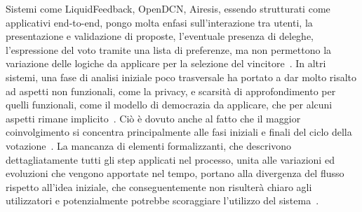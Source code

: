 \documentclass[12pt,a4paper,openright,twoside]{book}
\begin{document}
Sistemi come LiquidFeedback, OpenDCN, Airesis, essendo strutturati come applicativi end-to-end,
pongo molta enfasi sull'interazione tra utenti, la presentazione e validazione di proposte,
l'eventuale presenza di deleghe, l'espressione del voto tramite una lista di preferenze, ma
non permettono la variazione delle logiche da applicare per la selezione del vincitore~\cite{Trapanese:2018}.
In altri sistemi, una fase di analisi iniziale poco trasversale ha portato a dar molto risalto
ad aspetti non funzionali, come la privacy, e scarsità di approfondimento per quelli funzionali, come il modello di democrazia
da applicare, che per alcuni aspetti rimane implicito~\cite{Pianini:2019}.
Ciò è dovuto anche al fatto che il maggior coinvolgimento si concentra 
principalmente alle fasi iniziali e finali del ciclo della votazione~\cite{hennen2020european}.
La mancanza di elementi formalizzanti, che descrivono dettagliatamente tutti gli step applicati nel
processo, unita alle variazioni ed evoluzioni che vengono apportate nel tempo, portano alla divergenza del flusso rispetto all'idea iniziale, 
che conseguentemente non risulterà chiaro agli utilizzatori e potenzialmente potrebbe scoraggiare l'utilizzo del sistema~\cite{Pianini:2019}.
\end{document}
